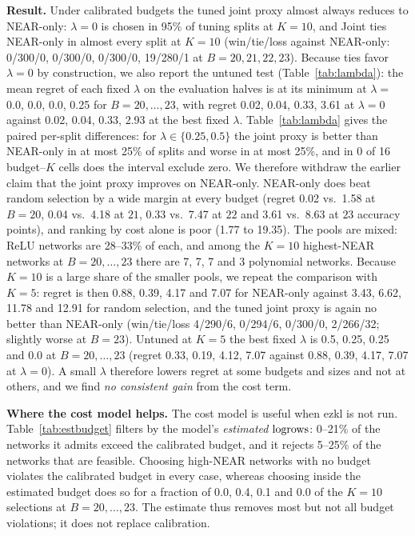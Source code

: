 \textbf{Result.}  Under calibrated budgets the tuned joint proxy almost always reduces to NEAR-only: $\lambda=0$ is chosen in 95\% of tuning splits at $K=10$, and Joint ties NEAR-only in almost
every split at $K=10$ (win/tie/loss against NEAR-only: 0/300/0, 0/300/0, 0/300/0, 19/280/1 at $B=20,21,22,23$).  Because ties favor $\lambda=0$ by construction, we also report the untuned test (Table~\ref{tab:lambda}): the mean regret of each fixed $\lambda$ on the evaluation halves is at its minimum at $\lambda=$ 0.0, 0.0, 0.0, 0.25 for $B=20,\dots,23$, with regret 0.02, 0.04, 0.33, 3.61 at $\lambda=0$ against 0.02, 0.04, 0.33, 2.93 at the best fixed $\lambda$.  Table~\ref{tab:lambda} gives the paired per-split differences: for $\lambda\in\{0.25,0.5\}$ the joint proxy is better than NEAR-only in at most 25\% of splits and worse in at most 25\%, and in 0 of 16 budget--$K$ cells does the interval exclude zero.  We therefore withdraw the earlier claim that the joint proxy improves on NEAR-only.
NEAR-only does beat random selection by a wide margin at every budget (regret 0.02 vs.\ 1.58 at $B=20$, 0.04 vs.\ 4.18 at $21$, 0.33 vs.\ 7.47 at $22$ and
3.61 vs.\ 8.63 at $23$ accuracy points), and ranking by cost alone is poor (1.77 to 19.35).  The pools are mixed: ReLU networks are 28--33\% of each, and among the $K=10$ highest-NEAR networks at $B=20,\dots,23$ there are 7, 7, 7 and 3 polynomial
networks.  Because $K=10$ is a large share of the smaller pools, we repeat the comparison with $K=5$: regret is then 0.88, 0.39, 4.17 and 7.07 for NEAR-only against 3.43, 6.62, 11.78 and 12.91 for random selection,
and the tuned joint proxy is again no better than NEAR-only (win/tie/loss 4/290/6, 0/294/6, 0/300/0, 2/266/32; slightly worse at $B=23$).  Untuned at $K=5$ the best fixed $\lambda$ is 0.5, 0.25, 0.25 and 0.0 at $B=20,\dots,23$ (regret 0.33, 0.19, 4.12, 7.07 against 0.88, 0.39, 4.17, 7.07 at $\lambda=0$).  A small $\lambda$ therefore lowers regret at some budgets and sizes and not at others, and we find \emph{no consistent gain} from the cost term.

\textbf{Where the cost model helps.}  The cost model is useful when ezkl is not run.  Table~\ref{tab:estbudget} filters by the model's \emph{estimated} $\mathrm{logrows}$:
0--21\% of the networks it admits exceed the calibrated budget, and it rejects 5--25\% of the networks that are feasible.  Choosing high-NEAR networks with no budget
violates the calibrated budget in every case, whereas choosing inside the estimated budget does so for a fraction of 0.0, 0.4, 0.1 and 0.0 of the $K=10$ selections at $B=20,\dots,23$.  The estimate thus removes most
but not all budget violations; it does not replace calibration.


